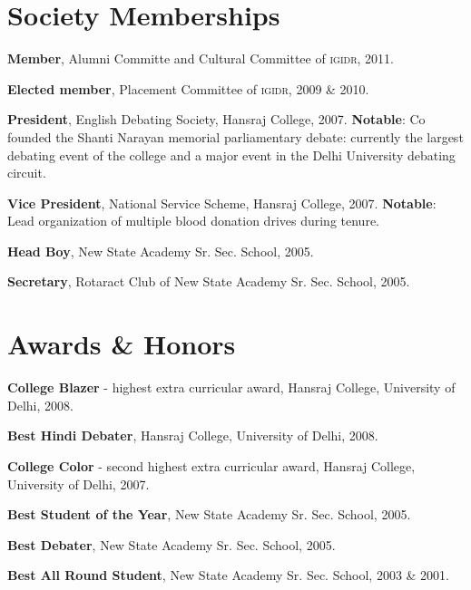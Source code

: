 \documentclass[a4paper,10pt]{article}
\newcommand{\abbrv}[1]{\textsc{#1}}
\renewenvironment{itemize}{
\begin{list}{}{
  \setlength{\leftmargin}{1.5em}
  }
  }{
\end{list}
}
\begin{document}
\section*{Society Memberships}
\begin{itemize}
  \item \textbf{Member}, Alumni Committe and Cultural Committee of
    \abbrv{igidr}, 2011.
  \item \textbf{Elected member}, Placement Committee of \abbrv{igidr}, 2009 \&
    2010.
  \item \textbf{President}, English Debating Society, Hansraj College, 2007.
    \textbf{Notable}: Co founded the Shanti Narayan memorial parliamentary
    debate: currently the largest debating event of the college and a major
    event in the Delhi University debating circuit.
  \item \textbf{Vice President}, National Service Scheme, Hansraj College,
    2007. \textbf{Notable}: Lead organization of multiple blood donation drives during
    tenure.
  \item \textbf{Head Boy}, New State Academy Sr. Sec. School, 2005.
  \item \textbf{Secretary}, Rotaract Club of New State Academy Sr. Sec. School,
    2005.
\end{itemize}

\section*{Awards \& Honors}
\begin{itemize}
  \item \textbf{College Blazer} - highest extra curricular award, Hansraj
    College, University of Delhi, 2008.
  \item \textbf{Best Hindi Debater}, Hansraj College, University of Delhi,
    2008.
  \item \textbf{College Color} - second highest extra curricular award, Hansraj
    College, University of Delhi, 2007.
  \item \textbf{Best Student of the Year}, New State Academy Sr. Sec. School,
    2005.
  \item \textbf{Best Debater}, New State Academy Sr. Sec. School, 2005.
  \item \textbf{Best All Round Student}, New State Academy Sr. Sec. School,
    2003 \& 2001.
\end{itemize}
\end{document}
